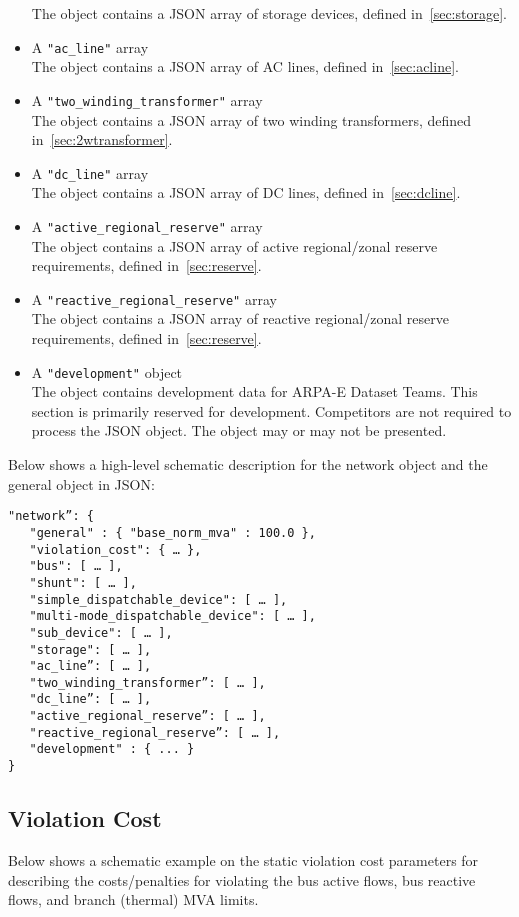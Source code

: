 \begin{itemize}
    The object contains a JSON array of storage devices, defined in~\ref{sec:storage}.
    \item A \texttt{"ac\_line"} array\\
    The object contains a JSON array of AC lines, defined in~\ref{sec:acline}.
    \item A \texttt{"two\_winding\_transformer"} array\\
    The object contains a JSON array of two winding transformers, defined in~\ref{sec:2wtransformer}.
    \item A \texttt{"dc\_line"} array\\
    The object contains a JSON array of DC lines, defined in~\ref{sec:dcline}.
    \item A \texttt{"active\_regional\_reserve"} array\\
    The object contains a JSON array of active regional/zonal reserve requirements, defined in~\ref{sec:reserve}.
    \item A \texttt{"reactive\_regional\_reserve"} array\\
    The object contains a JSON array of reactive regional/zonal reserve requirements, defined in~\ref{sec:reserve}.
    \item A \texttt{"development"} object\\
    The object contains development data for ARPA-E Dataset Teams. This section is primarily reserved for development. Competitors are not required to process the JSON object. The object may or may not be presented. 
\end{itemize}

Below shows a high-level schematic description for the network object and the general object in JSON:
\begin{verbatim}
"network”: {
   "general" : { "base_norm_mva" : 100.0 },
   "violation_cost": { … },
   "bus": [ … ],
   "shunt": [ … ],
   "simple_dispatchable_device": [ … ],
   "multi-mode_dispatchable_device": [ … ],
   "sub_device": [ … ],
   "storage": [ … ],
   "ac_line”: [ … ],
   "two_winding_transformer”: [ … ],
   "dc_line”: [ … ],   
   "active_regional_reserve”: [ … ],
   "reactive_regional_reserve”: [ … ],
   "development" : { ... }
}    
\end{verbatim}

\subsection{Violation Cost}
\label{sec:violation}
Below shows a schematic example on the static violation cost parameters for 
describing the costs/penalties for violating the bus active flows, bus reactive flows, 
and branch (thermal) MVA limits. 

